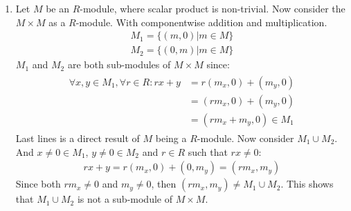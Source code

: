 \begin{enumerate}[label=]
    \item
        Let $M$ be an $R$-module, where scalar product is non-trivial. Now consider the $M \times M$ as a $R$-module. With componentwise addition and multiplication.
        \begin{gather*}
            M_1 = \{ (m, 0) | m \in M \} \\
            M_2 = \{ (0, m) | m \in M \}
        \end{gather*}
        $M_1$ and $M_2$ are both sub-modules of $M \times M$ since:
        \begin{gather*}
            \begin{split}
                \forall x, y \in M_1, \forall r \in R: rx + y & = r(m_x, 0) + (m_y, 0) \\
                & = (rm_x, 0) + (m_y, 0) \\
                & = (rm_x + m_y, 0) \in M_1
            \end{split}
        \end{gather*}
        Last lines is a direct result of $M$ being a $R$-module. Now consider $M_1 \cup M_2$. And $x \ne 0 \in M_1$, $y \ne 0 \in M_2$ and $r \in R$ such that $rx \ne 0$:
        \begin{gather*}
            rx + y = r(m_x, 0) + (0, m_y) = (rm_x, m_y)
        \end{gather*}
        Since both $rm_x \ne 0$ and $m_y \ne 0$, then $(rm_x, m_y) \ne M_1 \cup M_2$. This shows that $M_1 \cup M_2$ is not a sub-module of $M \times M$.
\end{enumerate}